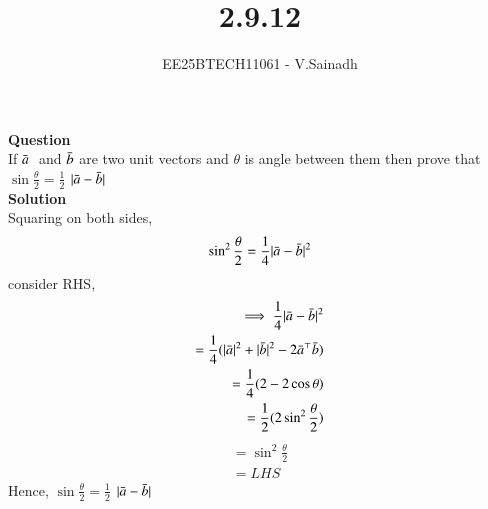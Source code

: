 \documentclass[journal]{IEEEtran}
\begin{document}

\vspace{3cm}

\title{2.9.12}
\author{EE25BTECH11061 - V.Sainadh}
{\let\newpage\relax\maketitle}
\renewcommand{\thefigure}{\theenumi}
\renewcommand{\thetable}{\theenumi}
\setlength{\intextsep}{10pt} %
\textbf{Question}\\If $\Bar{a} \;$ and \;$ \Bar{b} $ are two unit vectors and $\theta$ is angle between them then prove that \\ $\sin\frac{\theta}{2}=\frac{1}{2}$ $| {\Bar{a}-\Bar{b}}|$\\
\textbf{Solution}\\Squaring on both sides,\\
\begin{align*}
    \sin^2\frac{\theta}{2}=\frac{1}{4}| {\Bar{a}-\Bar{b}}|^2\\
    \end{align*}
  consider RHS,\\
\begin{align}
 \implies \frac{1}{4}| {\Bar{a}-\Bar{b}}|^2\\
  =\frac{1}{4}( |\Bar{a}|^2+|\Bar{b}|^2-2\Bar{a}^\top\Bar{b})\\
  =\frac{1}{4}(2-2\cos \theta)\\
  =\frac{1}{2}(2\sin^2{\frac{\theta}{2}})\\
  \end{align}
  \begin{align}
=\sin^2\frac{\theta}{2}\\
=LHS
\end{align}
Hence, $\sin\frac{\theta}{2}=\frac{1}{2}$  $| {\Bar{a}-\Bar{b}}|
$ 
\end{document}
